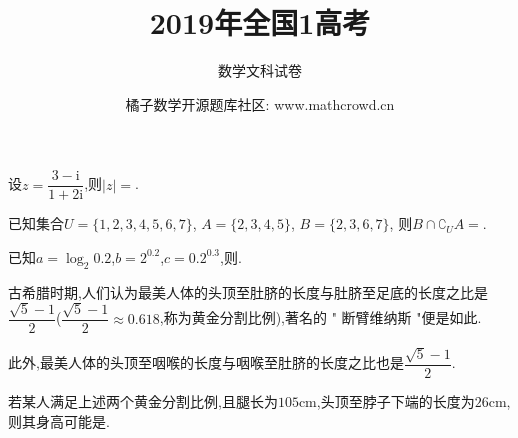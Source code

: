 \documentclass[windows,list]{BHCexam}
\begin{document}
\title{2019年全国1高考}
\subtitle{数学文科试卷}
\author{橘子数学开源题库社区: www.mathcrowd.cn}
\date{}
\maketitle
\begin{groups}
\begin{questions}[]
\begin{minipage}{\linewidth}
	
\question[5] 设$z= \dfrac {3-\mathrm{i}}{1+2\mathrm{i}}$,则$|z|=$.
\begin{solution}{4cm}

\end{solution}
\end{minipage}

\vfill

\begin{minipage}{\linewidth}
\question[5] 已知集合$U=\{1 , 2 , 3 , 4 , 5 , 6 , 7\}$, $A=\{2 , 3 , 4 , 5\}$, $B=\{2 , 3 , 6 , 7\}$, 则$B \cap  {\complement}_{U}A =$.

\begin{solution}{4cm}

\end{solution}
\end{minipage}
\vfill
\begin{minipage}{\linewidth}
\question[5] 已知$a=\log _{2} 0.2$,$b=2 ^{0.2}$,$c=0.2 ^{0.3}$,则.
\begin{solution}{4cm}

\end{solution}
\end{minipage}
\vfill
\begin{minipage}{\linewidth}
	
\question[5] 古希腊时期,人们认为最美人体的头顶至肚脐的长度与肚脐至足底的长度之比是$\dfrac{ \sqrt{5} - 1}{2}$($\dfrac{ \sqrt{5} - 1}{2}  \approx 0.618$,称为黄金分割比例),著名的 " 断臂维纳斯 "便是如此.

此外,最美人体的头顶至咽喉的长度与咽喉至肚脐的长度之比也是$\dfrac{ \sqrt{5} - 1}{2}$.

若某人满足上述两个黄金分割比例,且腿长为$105\text{cm}$,头顶至脖子下端的长度为$26 \text{cm}$,则其身高可能是.


\end{minipage}
\end{questions}
\end{groups}
\end{document}
